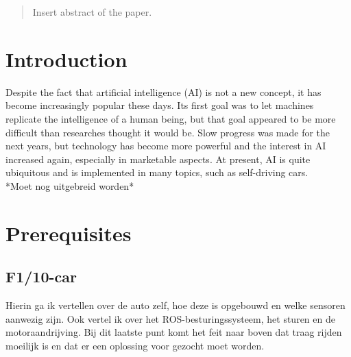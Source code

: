 \documentclass[conference,a4paper]{IEEEtran}
\begin{document}
\begin{abstract}
Insert abstract of the paper.

\end{abstract}


%
\IEEEpeerreviewmaketitle



\section{Introduction}
Despite the fact that artificial intelligence (AI) is not a new concept, it has become increasingly popular these days. Its first goal was to let machines replicate the intelligence of a human being, but that goal appeared to be more difficult than researches thought it would be. Slow progress was made for the next years, but technology has become more powerful and the interest in AI increased again, especially in marketable aspects\cite{Brooks1991}. At present, AI is quite ubiquitous and is implemented in many topics, such as self-driving cars. \\

*Moet nog uitgebreid worden*

\section{Prerequisites}
\subsection{F1/10-car}
Hierin ga ik vertellen over de auto zelf, hoe deze is opgebouwd en welke sensoren aanwezig zijn. Ook vertel ik over het ROS-besturingssysteem, het sturen en de motoraandrijving. Bij dit laatste punt komt het feit naar boven dat traag rijden moeilijk is en dat er een oplossing voor gezocht moet worden.
\end{document}
